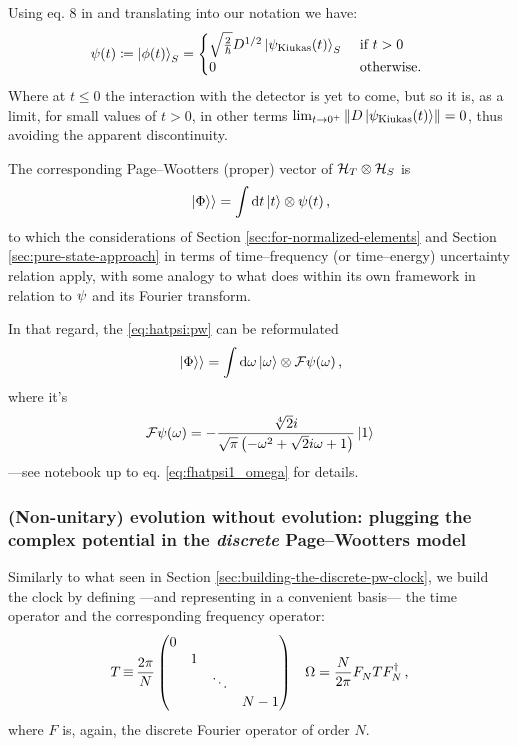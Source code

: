 \citereset
Using eq. 8 in \cite{RuschhauptAbsorption} and translating into our notation we have:
\begin{equation}\label{eq:phi_psi_kiukas}
  {\psi}(t) \coloneqq
  \ket{\phi(t)}_S =
  \begin{cases}
    \sqrt{\frac{2}{\hbar}} {D}^{1/2} \ket{\psi_{\text{Kiukas}}(t)}_S &\text{ if } t > 0 \\
    0 &\text{ otherwise. }
  \end{cases}
\end{equation}
Where at $t \le 0$ the interaction with the detector is yet to come,
but so it is, as a limit, for small values of $t>0$,
in other terms
$\lim_{t \to 0^{+}} \norm{{D} \ket{\psi_{\text{Kiukas}}(t)}} = 0$, thus avoiding the apparent discontinuity.

The corresponding Page--Wootters (proper) vector of $\mathcal{H}_T \otimes \mathcal{H}_S$ is
\begin{equation}\label{eq:hatpsi:pw}
  \left.\left| \Phi \right\rangle\right\rangle = \int \dd{t} \ket{t} \otimes {\psi}(t) \,\text{,}
\end{equation}
to which the considerations of Section \ref{sec:for-normalized-elements}
and Section \ref{sec:pure-state-approach} in terms of time--frequency
(or time--energy) uncertainty relation apply, with some analogy
to what \cite{RuschhauptAbsorption} does within its own framework
in relation to ${\psi}$ and its Fourier transform.

In that regard, the \eqref{eq:hatpsi:pw} can be reformulated
\begin{equation}
  \left.\left| \Phi \right\rangle\right\rangle = \int \dd{\omega} \ket{\omega} \otimes \mathcal{F} {\psi} (\omega) \,\text{,}
\end{equation}
where it's
\begin{equation}
  \mathcal{F} {\psi} (\omega) = - \frac{\sqrt[4]{2} i}{\sqrt{\pi} \left(- \omega^{2} + \sqrt{2} i \omega + 1\right)} \ket{1}
\end{equation}
---see notebook up to eq. \eqref{eq:fhatpsi1_omega} for details.


\citereset
\subsubsection{
  (Non-unitary) evolution without evolution:
  plugging the complex potential in the \emph{discrete} Page--Wootters model
}

Similarly to what seen in Section \ref{sec:building-the-discrete-pw-clock}, we build
the clock by defining ---and representing in a convenient basis---
the time operator and the corresponding frequency operator:
\begin{align}
  {T} \operatorname*{\equiv} \frac{2\pi}{N}
  \begin{pmatrix}
    0           &       &       &       \\
                &1      &       &       \\
                &       &\ddots &       \\
                &       &       &N-1
  \end{pmatrix}
  &&
  {\Omega} = \frac{N}{2\pi} F^{}_{N} {T} F^{\dagger}_{N} \, \text{,}
\end{align}
where $F$ is, again, the discrete Fourier operator of order $N$.

